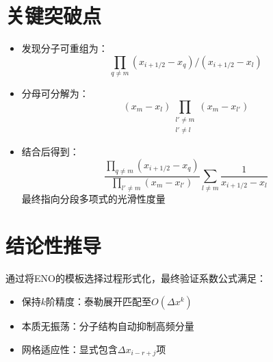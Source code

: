 \documentclass{ctexart}
\begin{document}
\section{关键突破点}
\begin{itemize}
    \item 发现分子可重组为：
    \[
    \prod_{q\neq m} (x_{i+1/2}-x_q) \bigg/ (x_{i+1/2}-x_l)
    \]
    \item 分母可分解为：
    \[
    (x_m-x_l) \prod_{\substack{l'\neq m \\ l'\neq l}} (x_m-x_{l'})
    \]
    \item 结合后得到：
    \[
    \frac{\prod_{q\neq m} (x_{i+1/2}-x_q)}{\prod_{l'\neq m} (x_m-x_{l'})} \sum_{l\neq m} \frac{1}{x_{i+1/2}-x_l}
    \]
    最终指向分段多项式的光滑性度量
\end{itemize}

\section{结论性推导}
通过将ENO的模板选择过程形式化，最终验证系数公式满足：
\begin{itemize}
    \item 保持$k$阶精度：泰勒展开匹配至$O(\Delta x^k)$
    \item 本质无振荡：分子结构自动抑制高频分量
    \item 网格适应性：显式包含$\Delta x_{i-r+j}$项
\end{itemize}
\end{document}
